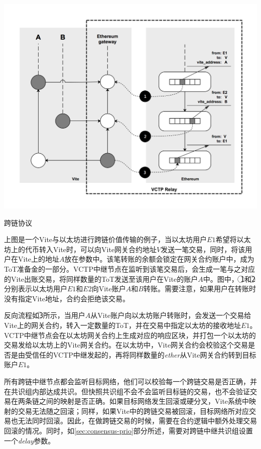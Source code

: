 \documentclass[UTF8,nofonts]{ctexart}
\makeatletter
\newenvironment{figurehere}
 {\def\@captype{figure}}
 {}
\makeatother
\begin{document}
\begin{multicols}{2}
\begin{center}
\begin{figurehere}
\includegraphics[width=\linewidth]{image/crosschain.png}
\caption{跨链协议}
\end{figurehere}
\end{center}

上图是一个Vite与以太坊进行跨链价值传输的例子，当以太坊用户$E1$希望将以太坊上的代币转入Vite时，可以向Vite网关合约地址$V$发送一笔交易，同时，将该用户在Vite上的地址$A$放在参数中。该笔转账的余额会锁定在网关合约账户中，成为ToT准备金的一部分。VCTP中继节点在监听到该笔交易后，会生成一笔与之对应的Vite出账交易，将同样数量的ToT发送至该用户在Vite的账户$A$中。图中，
\textcircled{1}和\textcircled{2}分别表示以太坊用户$E1$和$E2$向Vite账户$A$和$B$转账。需要注意，如果用户在转账时没有指定Vite地址，合约会拒绝该交易。

反向流程如\textcircled{3}所示，当用户$A$从Vite账户向以太坊账户转账时，会发送一个交易给Vite上的网关合约，转入一定数量的ToT，并在交易中指定以太坊的接收地址$E1$。VCTP中继节点会在以太坊网关合约上生成对应的响应区块，并打包一个以太坊的交易发给以太坊上的Vite网关合约。在以太坊中，Vite网关合约会校验这个交易是否是由受信任的VCTP中继发起的，再将同样数量的\textit{ether}从Vite网关合约转到目标账户$E1$。

所有跨链中继节点都会监听目标网络，他们可以校验每一个跨链交易是否正确，并在共识组内部达成共识。但快照共识组不会不会监听目标链的交易，也不会验证交易在两条链之间的映射是否正确。如果目标网络发生回滚或硬分叉，Vite系统中映射的交易无法随之回滚；同样，如果Vite中的跨链交易被回滚，目标网络所对应交易也无法同时回滚。因此，在做跨链交易的时候，需要在合约逻辑中额外处理交易回滚的情况。同时，如\ref{sec:consensus-prio}部分所述，需要对跨链中继共识组设置一个\textit{delay}参数。


\end{multicols}
\end{document}

